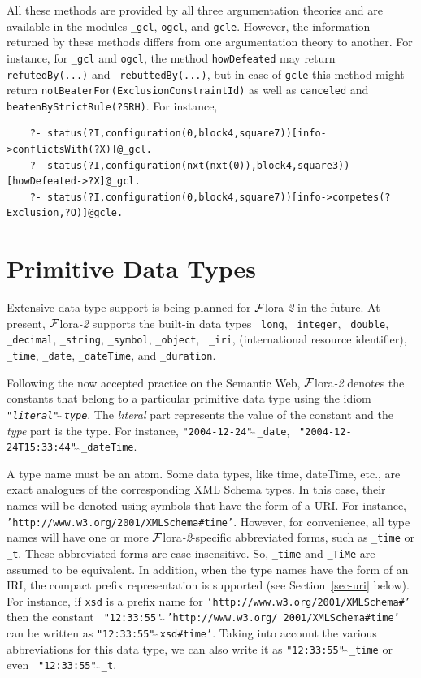 \documentclass[11pt]{article}
\newcommand{\FLORA}{{\mbox{\sc ${\cal F}${lora}\rm\emph{-2}}}\xspace}
\begin{document}
All these methods are provided by all three argumentation theories and are
available in the modules {\tt \_gcl}, {\tt ogcl}, and {\tt gcle}. However,
the information returned by these methods differs from one argumentation theory
to another. For instance, for {\tt \_gcl} and {\tt ogcl}, the method
{\tt howDefeated} may return {\tt refutedBy(...)} and {\tt
  rebuttedBy(...)}, but in case of {\tt gcle} this method might return
{\tt notBeaterFor(ExclusionConstraintId)} as well as \texttt{canceled} and
\texttt{beatenByStrictRule(?SRH)}.    
For instance,
\begin{verbatim}
    ?- status(?I,configuration(0,block4,square7))[info->conflictsWith(?X)]@_gcl.
    ?- status(?I,configuration(nxt(nxt(0)),block4,square3))[howDefeated->?X]@_gcl.
    ?- status(?I,configuration(0,block4,square7))[info->competes(?Exclusion,?O)]@gcle.
\end{verbatim}


\section{Primitive Data Types}\label{sec-data-types}

Extensive data type support is being planned for \FLORA in the future.
At present, \FLORA supports the built-in data types
{\tt \_long}, \texttt{\_integer},
{\tt \_double},  \texttt{\_decimal},
\texttt{\_string}, {\tt \_symbol}, {\tt \_object}, {\tt
  \_iri}, (international resource identifier), {\tt \_time}, {\tt \_date},
{\tt \_dateTime}, and {\tt \_duration}.

Following the now accepted practice on the Semantic Web, \FLORA denotes the
constants that belong to a particular primitive data type using the idiom
{\tt "\emph{literal}"$\hat{~}\hat{~}$\emph{type}}. The \emph{literal} part
represents the value of the constant and the \emph{type} part is the
type. For instance, {\tt "2004-12-24"$\hat{~}\hat{~}$\_date}, {\tt
  "2004-12-24T15:33:44"$\hat{~}\hat{~}$\_dateTime}.

A type name must be an atom.
Some data types, like time, dateTime, etc., are exact analogues of the
corresponding XML Schema types. In this case, their names will be denoted
using symbols that have the form of a URI. For instance,
{\tt 'http://www.w3.org/2001/XMLSchema\#time'}.  However, for convenience,
all type names will have one or more \FLORA-specific abbreviated forms, such as
{\tt \_time} or {\tt \_t}. These abbreviated forms are
case-insensitive. So, {\tt \_time} and
{\tt \_TiMe} are assumed to be equivalent. In addition, when the type names have
the form of an IRI, the compact prefix representation is supported (see
Section~\ref{sec-uri} below). For
instance, if {\tt xsd}  is a prefix name for
{\tt 'http://www.w3.org/2001/XMLSchema\#'} 
then the constant {\tt
  "12:33:55"$\hat{~}\hat{~}$'http://www.w3.org/ 2001/XMLSchema\#time'}  can be written as
{\tt "12:33:55"$\hat{~}\hat{~}$xsd\#time'}. Taking into account the
various abbreviations for this data type, we can also write it as
{\tt "12:33:55"$\hat{~}\hat{~}$\_time} or even {\tt
  "12:33:55"$\hat{~}\hat{~}$\_t}.
\end{document}
